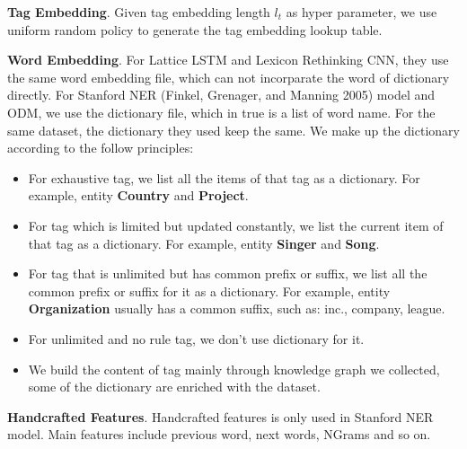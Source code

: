 \documentclass[letterpaper]{article} %
\begin{document}
\textbf{Tag Embedding}. Given tag embedding length $l_t$ as hyper parameter, we use uniform random policy to generate the tag embedding lookup table. 

\textbf{Word Embedding}. For Lattice LSTM and Lexicon Rethinking CNN, they use the same word embedding file, which can not incorparate the word of dictionary directly. For Stanford NER (Finkel, Grenager, and Manning 2005) model and ODM, we use the dictionary file, which in true is a list of word name. For the same dataset, the dictionary they used keep the same. We make up the dictionary according to the follow principles:

\begin{itemize}
\item For exhaustive tag, we list all the items of that tag as a dictionary. For example, entity \textbf{Country} and \textbf{Project}.
\item For tag which is limited but updated constantly, we list the current item of that tag as a dictionary. For example, entity \textbf{Singer} and \textbf{Song}.
\item For tag that is unlimited but has common prefix or suffix, we list all the common prefix or suffix for it as a dictionary. For example, entity \textbf{Organization} usually has a common suffix, such as: inc., company, league.
\item For unlimited and no rule tag, we don't use dictionary for it.
\item We build the content of tag mainly through knowledge graph we collected, some of the dictionary are enriched with the dataset.
\end{itemize}

\textbf{Handcrafted Features}. Handcrafted features is only used in Stanford NER model. Main features include previous word, next words, NGrams and so on. 


\begin{table}[t]
\caption{Main Results on MSRA.}\smallskip
\centering
{}
\label{table_msra}
\end{table}
\end{document}
